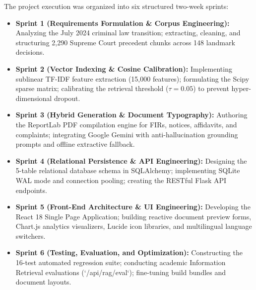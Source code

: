 The project execution was organized into six structured two-week sprints:
\begin{itemize}
    \item \textbf{Sprint 1 (Requirements Formulation \& Corpus Engineering):} Analyzing the July 2024 criminal law transition; extracting, cleaning, and structuring 2,290 Supreme Court precedent chunks across 148 landmark decisions.
    \item \textbf{Sprint 2 (Vector Indexing \& Cosine Calibration):} Implementing sublinear TF-IDF feature extraction (15,000 features); formulating the Scipy sparse matrix; calibrating the retrieval threshold ($\tau = 0.05$) to prevent hyper-dimensional dropout.
    \item \textbf{Sprint 3 (Hybrid Generation \& Document Typography):} Authoring the ReportLab PDF compilation engine for FIRs, notices, affidavits, and complaints; integrating Google Gemini with anti-hallucination grounding prompts and offline extractive fallback.
    \item \textbf{Sprint 4 (Relational Persistence \& API Engineering):} Designing the 5-table relational database schema in SQLAlchemy; implementing SQLite WAL mode and connection pooling; creating the RESTful Flask API endpoints.
    \item \textbf{Sprint 5 (Front-End Architecture \& UI Engineering):} Developing the React 18 Single Page Application; building reactive document preview forms, Chart.js analytics visualizers, Lucide icon libraries, and multilingual language switchers.
    \item \textbf{Sprint 6 (Testing, Evaluation, and Optimization):} Constructing the 16-test automated regression suite; conducting academic Information Retrieval evaluations (`/api/rag/eval`); fine-tuning build bundles and document layouts.
\end{itemize}
